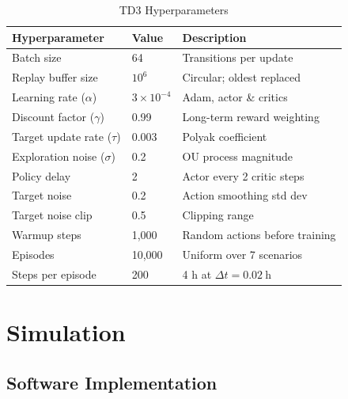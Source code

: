 \documentclass[12pt,a4paper]{article}
\begin{document}
\begin{table}[H]
  \centering
  \caption{TD3 Hyperparameters}
  \label{tab:hp}
  \renewcommand{\arraystretch}{1.3}
  \begin{tabular}{@{}lll@{}}
    \toprule
    \textbf{Hyperparameter} & \textbf{Value} & \textbf{Description} \\
    \midrule
    Batch size                      & 64                & Transitions per update \\
    Replay buffer size              & $10^6$            & Circular; oldest replaced \\
    Learning rate ($\alpha$)        & $3\times10^{-4}$  & Adam, actor \& critics \\
    Discount factor ($\gamma$)      & 0.99              & Long-term reward weighting \\
    Target update rate ($\tau$)     & 0.003             & Polyak coefficient \\
    Exploration noise ($\sigma$)    & 0.2               & OU process magnitude \\
    Policy delay                    & 2                 & Actor every 2 critic steps \\
    Target noise                    & 0.2               & Action smoothing std dev \\
    Target noise clip               & 0.5               & Clipping range \\
    Warmup steps                    & 1{,}000           & Random actions before training \\
    Episodes                        & 10{,}000          & Uniform over 7 scenarios \\
    Steps per episode               & 200               & 4 h at $\Delta t = 0.02\ \mathrm{h}$ \\
    \bottomrule
  \end{tabular}
\end{table}

\section{Simulation}

\subsection{Software Implementation}
\end{document}
